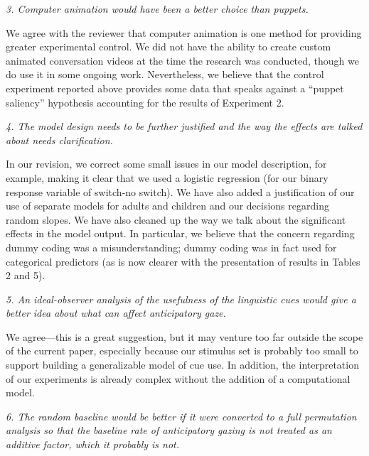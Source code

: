 \documentclass[11pt,a4paper]{letter} %
\begin{document}
\begin{letter}{}
\smallskip

\noindent \textit{3. Computer animation would have been a better choice than puppets.}

\noindent We agree with the reviewer that computer animation is one method for providing greater experimental control. We did not have the ability to create custom animated conversation videos at the time the research was conducted, though we do use it in some ongoing work. Nevertheless, we believe that the control experiment reported above provides some data that speaks against a ``puppet saliency'' hypothesis accounting for the results of Experiment 2. 

\smallskip

\noindent \textit{4. The model design needs to be further justified and the way the effects are talked about needs clarification.}

\noindent In our revision, we correct some small issues in our model description, for example, making it clear that we used a logistic regression (for our binary response variable of switch-no switch). We have also added a justification of our use of separate models for adults and children and our decisions regarding random slopes. We have also cleaned up the way we talk about the significant effects in the model output. In particular, we believe that the concern regarding dummy coding was a misunderstanding; dummy coding was in fact used for categorical predictors (as is now clearer with the presentation of results in Tables 2 and 5).

\smallskip

\noindent \textit{5. An ideal-observer analysis of the usefulness of the linguistic cues would give a better idea about what can affect anticipatory gaze.}

\noindent We agree---this is a great suggestion, but it may venture too far outside the scope of the current paper, especially because our stimulus set is probably too small to support building a generalizable model of cue use. In addition, the interpretation of our experiments is already complex without the addition of a computational model.  

\smallskip

\noindent \textit{6. The random baseline would be better if it were converted to a full permutation analysis so that the baseline rate of anticipatory gazing is not treated as an additive factor, which it probably is not.}


\end{letter}
\end{document}
